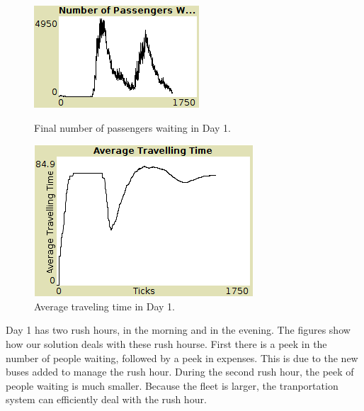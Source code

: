 \begin{figure}[htbp]
\centering
\begin{minipage}{.48\textwidth}
  \includegraphics[width=\linewidth]{src/nr_pass_waiting.png}
  \caption{Final number of passengers waiting in Day 1.}
  \label{fig:pass_waiting}
\end{minipage}
\begin{minipage}{.48\textwidth}
  \includegraphics[width=\linewidth]{src/avg_tt.png}
  \caption{Average traveling time in Day 1.}
  \label{fig:avg_tt}
\end{minipage}
\end{figure}

Day 1 has two rush hours, in the morning and in the evening. The figures show how our solution deals with these rush hourse. First there is a peek in the number of people waiting, followed by a peek in expenses. This is due to the new buses added to manage the rush hour. During the second rush hour, the peek of people waiting is much smaller. Because the fleet is larger, the tranportation system can efficiently deal with the rush hour.

